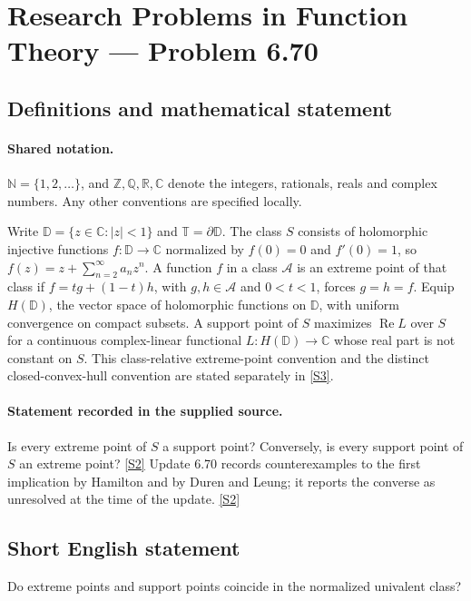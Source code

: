 \documentclass[11pt]{article}
\newcommand{\sref}[2]{\hyperlink{source:#1:#2}{[S#2]}}
\begin{document}
\section{Research Problems in Function Theory — Problem 6.70}\label{statement}

\subsection{Definitions and mathematical statement}

\paragraph{Shared notation.}$\mathbb N=\{1,2,\ldots\}$, and $\mathbb Z,\mathbb Q,\mathbb R,\mathbb C$ denote the integers, rationals, reals and complex numbers. Any other conventions are specified locally.


Write $\mathbb D=\{z\in\mathbb C:|z|<1\}$ and $\mathbb T=\partial\mathbb D$. The class $S$ consists of holomorphic injective functions $f:\mathbb D\to\mathbb C$ normalized by $f(0)=0$ and $f'(0)=1$, so $f(z)=z+\sum_{n=2}^{\infty}a_nz^n$. A function $f$ in a class $\mathcal A$ is an extreme point of that class if $f=tg+(1-t)h$, with $g,h\in\mathcal A$ and $0<t<1$, forces $g=h=f$. Equip $H(\mathbb D)$, the vector space of holomorphic functions on $\mathbb D$, with uniform convergence on compact subsets. A support point of $S$ maximizes $\operatorname{Re}L$ over $S$ for a continuous complex-linear functional $L:H(\mathbb D)\to\mathbb C$ whose real part is not constant on $S$.  This class-relative extreme-point convention and the distinct closed-convex-hull convention are stated separately in \sref{statement}{3}.
\paragraph{Statement recorded in the supplied source.}
Is every extreme point of $S$ a support point? Conversely, is every support point of $S$ an extreme point? \sref{statement}{2}
Update 6.70 records counterexamples to the first implication by Hamilton and by Duren and Leung; it reports the converse as unresolved at the time of the update. \sref{statement}{2}
\subsection{Short English statement}
Do extreme points and support points coincide in the normalized univalent class?
\end{document}

